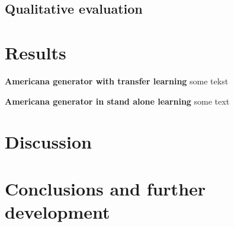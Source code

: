 \documentclass{IEEEtran}
\begin{document}
    \subsection{Qualitative evaluation}
    
    \section{Results}
    \textbf{Americana generator with transfer learning}
    some tekst

    \textbf{Americana generator in stand alone learning}
    some text
    
    \section{Discussion}
    
    \section{Conclusions and further development}

    \printbibliography
\end{document}
